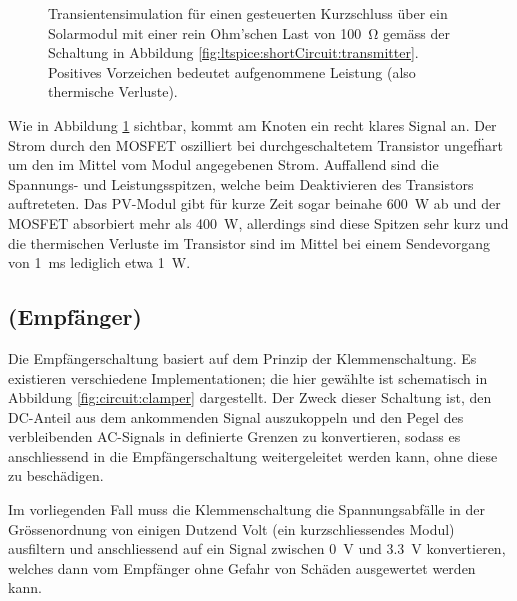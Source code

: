 \begin{figure}[h!tb]
    
    \caption{%
        Transientensimulation    f\"ur     einen    gesteuerten    Kurzschluss
        \"uber     ein     Solarmodul     mit     einer     rein     Ohm'schen
        Last      von      \SI{100}{\ohm}     gem\"ass      der      Schaltung
        in   Abbildung   \ref{fig:ltspice:shortCircuit:transmitter}. Positives
        Vorzeichen bedeutet aufgenommene Leistung (also thermische Verluste).%
    }
    \label{fig:simu:shortCircuit:transmitter}
\end{figure}


Wie  in Abbildung  \ref{fig:simu:shortCircuit:transmitter} sichtbar,  kommt am
Knoten  ein  recht klares Signal an. Der Strom  durch den MOSFET
oszilliert bei durchgeschaltetem  Transistor ungef\"hart um den  im Mittel vom
Modul angegebenen Strom. Auffallend sind  die Spannungs- und Leistungsspitzen,
welche beim Deaktivieren des  Transistors auftreteten. Das PV-Modul gibt f\"ur
kurze  Zeit  sogar  beinahe  \SI{600}{\watt}  ab  und  der  MOSFET  absorbiert
mehr  als \SI{400}{\watt},  allerdings sind  diese Spitzen  sehr kurz  und die
thermischen Verluste im  Transistor sind im Mittel bei  einem Sendevorgang von
\SI{1}{\milli\second} lediglich etwa \SI{1}{\watt}.


\clearpage
\subsection{\Master (Empf\"anger)}
\label{subsec:simu:ask:recv}

Die  Empf\"angerschaltung basiert  auf  dem  Prinzip der  Klemmenschaltung. Es
existieren verschiedene Implementationen; die  hier gew\"ahlte ist schematisch
in Abbildung \ref{fig:circuit:clamper} dargestellt. Der Zweck dieser Schaltung
ist, den DC-Anteil  aus dem ankommenden Signal auszukoppeln und  den Pegel des
verbleibenden  AC-Signals in  definierte  Grenzen zu  konvertieren, sodass  es
anschliessend  in die  Empf\"angerschaltung weitergeleitet  werden kann,  ohne
diese zu besch\"adigen.

Im vorliegenden Fall  muss die Klemmenschaltung die  Spannungsabf\"alle in der
Gr\"ossenordnung  von  einigen  Dutzend  Volt  (ein  kurzschliessendes  Modul)
ausfiltern  und  anschliessend  auf  ein  Signal  zwischen  \SI{0}{\volt}  und
\SI{3.3}{\volt}  konvertieren, welches  dann vom  Empf\"anger ohne  Gefahr von
Sch\"aden ausgewertet werden kann.

